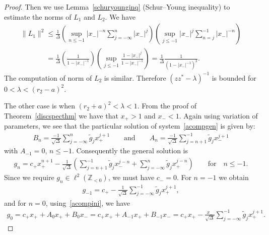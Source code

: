 \documentclass[11pt]{article}
\numberwithin{equation}{section}
\begin{document}
\begin{proof}
Then we use Lemma~\ref{schuryounginq} (Schur--Young inequality) to estimate the norms of $L_1$ and $L_2$.
We have
\begin{gather*}
\|L_1\|^2
\le \frac{1}{\Delta}\left(\underset{n\le-1}{\sup}|x_-|^{-n}\sum\limits_{j=-\infty}^n|x_-|^j\right)
\left(\underset{j\le-1}{\sup}|x_-|^j\sum\limits_{n=j}^{-1}|x_-|^{-n}\right)
\\
\phantom{\|L_1\|^2}{}
 =\frac{1}{\Delta}\left(\frac{1}{1-|x_-|^{-1}}\right)\left(\underset{j\le-1}{\sup}\frac{1-|x_-|^{j}}{1-|x_-|^{-1}}\right)
 =\frac{1}{\Delta}\frac{1}{(1-|x_-|^{-1})^2}.
\end{gather*}
The computation of norm of $L_2$ is similar.
Therefore $(zz^*-\lambda)^{-1}$ is bounded for $0<\lambda<(r_2-a)^2$.

The other case is when $(r_2+a)^2<\lambda<1$.
From the proof of Theorem~\ref{discspecthm} we have that $x_+>1$ and $x_-<1$.
Again using variation of parameters, we see that the particular solution of system~\eqref{acompgen} is given by:
\begin{gather*}
B_n=\frac{-1}{\sqrt{\Delta}}\sum\limits_{j=-\infty}^n\tilde{g}_jx_+^{j+1}
\qquad
\text{and}
\qquad
A_n=\frac{-1}{\sqrt{\Delta}}\sum\limits_{j=n+1}^{-1}\tilde{g}_jx_-^{j+1}
\end{gather*}
with $A_{-1}=0$, $n\leq -1$.
Consequently the general solution is
\begin{gather*}
g_n=c_+x_+^{n+1} -\frac{1}{\sqrt{\Delta}}\left(\sum\limits_{j=n+1}^{-1}\tilde{g}_jx_-^{j-n}+\sum\limits_{j=-\infty}^n\tilde{g}_jx_+^{j-n}\right)
\qquad
\text{for}
\quad
n\leq-1.
\end{gather*}
Since we require $g_n\in\ell^2({\mathbb Z}_{<0})$, we must have $c_-=0$.
For $n=-1$ we obtain
\begin{gather*}
g_{-1}=c_+-\frac{1}{\sqrt{\Delta}}\sum\limits_{j=-\infty}^{-1}\tilde{g}_jx_+^{j+1},
\end{gather*}
and for $n=0$, using~\eqref{acompini}, we have
\begin{gather*}
g_{0}=c_+ x_++A_0x_++B_0x_-= c_+ x_++A_{-1}x_++B_{-1}x_-=c_+ x_+-\frac{x_-}{\sqrt{\Delta}}\sum\limits_{j=-\infty}^{-1}\tilde{g}_jx_+^{j+1}.
\end{gather*}


\end{proof}
\end{document}
